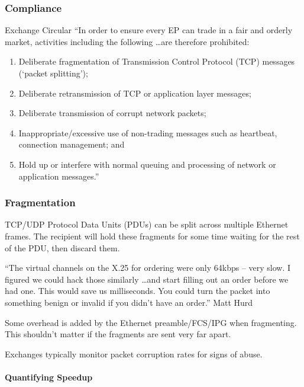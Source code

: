 \documentclass{article}
\begin{document}
\subsubsection{Compliance}
\begin{block}{Exchange Circular}
	``In order to ensure every EP can trade in a fair and orderly market, activities including the following \ldots are therefore prohibited:
	\begin{enumerate}
	\item Deliberate fragmentation of Transmission Control Protocol (TCP) messages (‘packet splitting’);
	\item Deliberate retransmission of TCP or application layer messages;
	\item Deliberate transmission of corrupt network packets;
	\item Inappropriate/excessive use of non-trading messages such as heartbeat, connection management; and
	\item Hold up or interfere with normal queuing and processing of network or application messages.''
	\end{enumerate}
\end{block}

\subsubsection{Fragmentation}
TCP/UDP Protocol Data Units (PDUs) can be split across multiple Ethernet frames. The recipient will hold these fragments for some time waiting for the rest of the PDU, then discard them.

\begin{block}{}
	``The virtual channels on the X.25 for ordering were only 64kbps – very slow. I figured we could hack those similarly \ldots and start filling out an order before we had one. This would save us milliseconds. You could turn the packet into something benign or invalid if you didn’t have an order.'' Matt Hurd
\end{block}

Some overhead is added by the Ethernet preamble/FCS/IPG when fragmenting. This shouldn't matter if the fragments are sent very far apart.

Exchanges typically monitor packet corruption rates for signs of abuse.

\paragraph{Quantifying Speedup}
\end{document}

